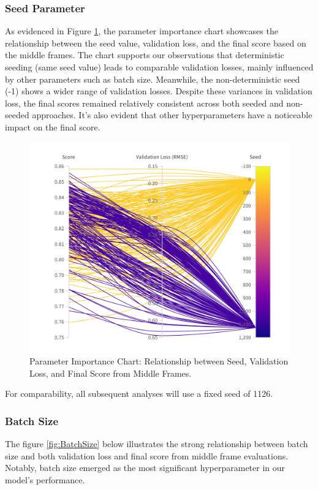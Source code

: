 \documentclass[a4paper,12pt,openright]{book}
\begin{document}
\subsubsection{Seed Parameter}
As evidenced in Figure \ref{fig:SEED}, the parameter importance chart showcases the relationship between the seed value, validation loss, and the final score based on the middle frames. The chart supports our observations that deterministic seeding (same seed value) leads to comparable validation losses, mainly influenced by other parameters such as batch size. Meanwhile, the non-deterministic seed (-1) shows a wider range of validation losses. Despite these variances in validation loss, the final scores remained relatively consistent across both seeded and non-seeded approaches. It's also evident that other hyperparameters have a noticeable impact on the final score. 

\begin{figure}[H]
\centering
\includegraphics[trim={0cm 2cm 0cm 2cm},clip,width=1.0\textwidth]{images/W&B Chart 03_09_2023, 15_11_19.png}
\caption{Parameter Importance Chart: Relationship between Seed, Validation Loss, and Final Score from Middle Frames.}
\label{fig:SEED}
\end{figure}
For comparability, all subsequent analyses will use a fixed seed of 1126.




\subsubsection{Batch Size}
The figure \ref{fig:BatchSize} below illustrates the strong relationship between batch size and both validation loss and final score from middle frame evaluations. Notably, batch size emerged as the most significant hyperparameter in our model's performance.
\end{document}
